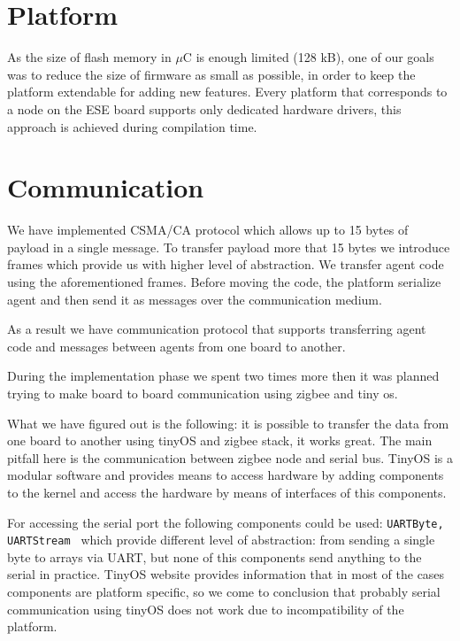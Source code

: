\documentclass{scrreprt}
\begin{document}
\section{Platform}

As the size of flash memory in $\mu$C is enough limited (128 kB),
one of our goals was to reduce the size of firmware as small as possible,
in order to keep the platform extendable for adding new features.
Every platform that corresponds to a node on the ESE board supports only 
dedicated hardware drivers, this approach is achieved during compilation time.








\section{Communication}

We have implemented CSMA/CA protocol which allows up to 15 bytes of payload
in a single message.
To transfer payload more that 15 bytes we introduce frames which
provide us with higher level of abstraction.
We transfer agent code using the aforementioned frames.
Before moving the code, the platform serialize agent and then send it as
messages over the communication medium.

As a result we have communication protocol that supports transferring 
agent code and messages between agents from one board to another.

During the implementation phase we spent two times more then it was planned 
trying to make board to board communication using zigbee and tiny os.


What we have figured out is the following: it is possible to transfer the data
from one board to another using tinyOS and zigbee stack, it works great. 
The main pitfall here is the communication between zigbee node and serial bus.
TinyOS is a modular software and provides means to access hardware by adding 
components to the kernel and access the hardware by means of interfaces of this components.


For accessing the serial port the following components could be used: \texttt{UARTByte, UARTStream }
which provide different level of abstraction: from sending a single byte to arrays
via UART, but none of this components send anything to the serial in practice.
TinyOS website provides information that in most of the cases components are 
platform specific, so we come to conclusion that probably serial communication
using tinyOS does not work due to incompatibility of the platform.
\end{document}
